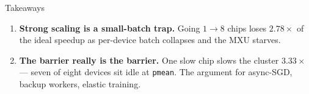 \documentclass[aspectratio=169,10pt]{beamer}
\begin{document}
\begin{frame}{Takeaways}
  \begin{enumerate}[<+->]\small
    \item \textbf{Strong scaling is a small-batch trap.} Going $1\to8$ chips loses
          \alert{$2.78\times$ of the ideal speedup} as per-device batch collapses and
          the MXU starves.
    \item \textbf{The barrier really is the barrier.} One slow chip
          \alert{slows the cluster $3.33\times$} — seven of eight devices sit idle at
          \texttt{pmean}. The argument for async-SGD, backup workers, elastic training.
  \end{enumerate}

  \vspace{0.4em}
\end{frame}
\end{document}
